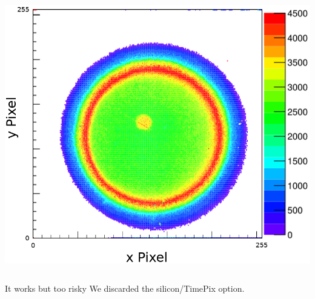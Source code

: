 \begin{frame}
\begin{columns}
\begin{column}{0.45\textwidth}
\begin{columns}
\begin{column}{0.45\textwidth}
        \end{column}
      \end{columns}
      \includegraphics[width=\textwidth]{04_Test/fig/fig000_IRMA_damage3.png}
    \end{column}
  \end{columns}
  \begin{alertblock}{It works but too risky}
    We discarded the silicon/TimePix option.
  \end{alertblock}
\end{frame}

